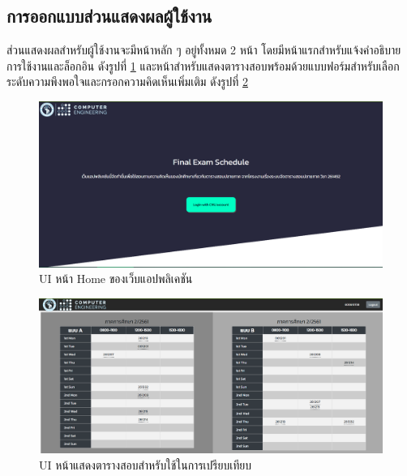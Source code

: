 \subsection{การออกแบบส่วนแสดงผลผู้ใช้งาน}
ส่วนแสดงผลสำหรับผู้ใช้งานจะมีหน้าหลัก ๆ อยู่ทั้งหมด 2 หน้า โดยมีหน้าแรกสำหรับแจ้งคำอธิบายการใช้งานและล็อกอิน ดังรูปที่ \ref{fig:eval_ui_1}
และหน้าสำหรับแสดงตารางสอบพร้อมด้วยแบบฟอร์มสำหรับเลือกระดับความพึงพอใจและกรอกความคิดเห็นเพิ่มเติม ดังรูปที่ \ref{fig:eval_ui_2}
\begin{figure}
    \begin{center}
      \includegraphics[width=\linewidth]{images/eval_ui_1.png}
    \end{center}
    \caption[UI หน้า Home ของเว็บแอปพลิเคชัน]{UI หน้า Home ของเว็บแอปพลิเคชัน}
    \label{fig:eval_ui_1}     
\end{figure}
\begin{figure}
    \begin{center}
      \includegraphics[width=\linewidth]{images/eval_ui_2.png}
    \end{center}
    \caption[UI หน้าแสดงตารางสอบสำหรับใช้ในการเปรียบเทียบ]{UI หน้าแสดงตารางสอบสำหรับใช้ในการเปรียบเทียบ}
    \label{fig:eval_ui_2}     
\end{figure}
\newpage

